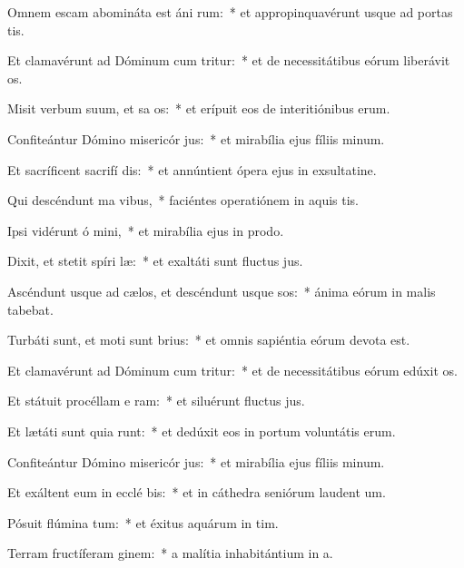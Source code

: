 \item Omnem escam abomináta est áni rum:~* et appropinquavérunt usque ad portas tis.
\item Et clamavérunt ad Dóminum cum tritur:~* et de necessitátibus eórum liberávit os.
\item Misit verbum suum, et sa os:~* et erípuit eos de interitiónibus erum.
\item Confiteántur Dómino misericór jus:~* et mirabília ejus fíliis minum.
\item Et sacríficent sacrifí dis:~* et annúntient ópera ejus in exsultatine.
\item Qui descéndunt ma  vibus,~* faciéntes operatiónem in aquis tis.
\item Ipsi vidérunt ó mini,~* et mirabília ejus in prodo.
\item Dixit, et stetit spíri læ:~* et exaltáti sunt fluctus jus.
\item Ascéndunt usque ad cælos, et descéndunt usque  sos:~* ánima eórum in malis tabebat.
\item Turbáti sunt, et moti sunt  brius:~* et omnis sapiéntia eórum devota est.
\item Et clamavérunt ad Dóminum cum tritur:~* et de necessitátibus eórum edúxit os.
\item Et státuit procéllam e  ram:~* et siluérunt fluctus jus.
\item Et lætáti sunt quia runt:~* et dedúxit eos in portum voluntátis erum.
\item Confiteántur Dómino misericór jus:~* et mirabília ejus fíliis minum.
\item Et exáltent eum in ecclé bis:~* et in cáthedra seniórum laudent um.
\item Pósuit flúmina  tum:~* et éxitus aquárum in tim.
\item Terram fructíferam  ginem:~* a malítia inhabitántium in a.
